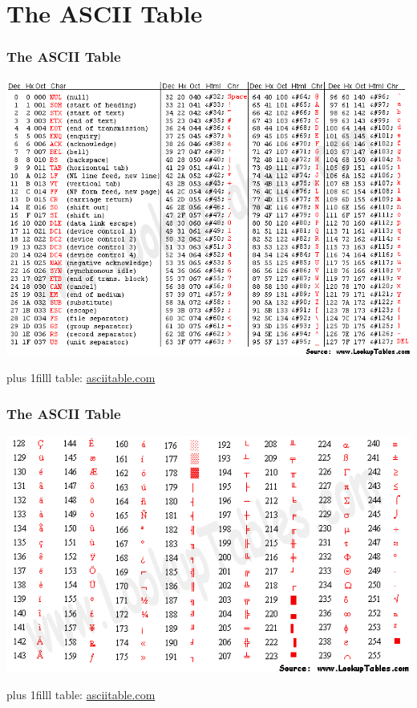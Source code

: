 \documentclass[fleqn]{beamer} %
\newcommand{\sectiontitleII}{The ASCII Table}
\newcommand{\btVFill}{\vskip0pt plus 1filll}
\begin{document}
\section{\sectiontitleII}


	\begin{frame}[label=sectionII] \small
	\frametitle{\sectiontitleII}
	
	\includegraphics[scale=.35]{asciifull.png}
	
	\btVFill
	\tiny{table: \href{http://www.asciitable.com/}{asciitable.com}}
	\end{frame}
	
	\begin{frame}[label=sectionII] \small
	\frametitle{\sectiontitleII}
	
	\includegraphics[scale=.35]{asciiextended.png}
	
	\btVFill
	\tiny{table: \href{http://www.asciitable.com/}{asciitable.com}}
	\end{frame}
\end{document}
